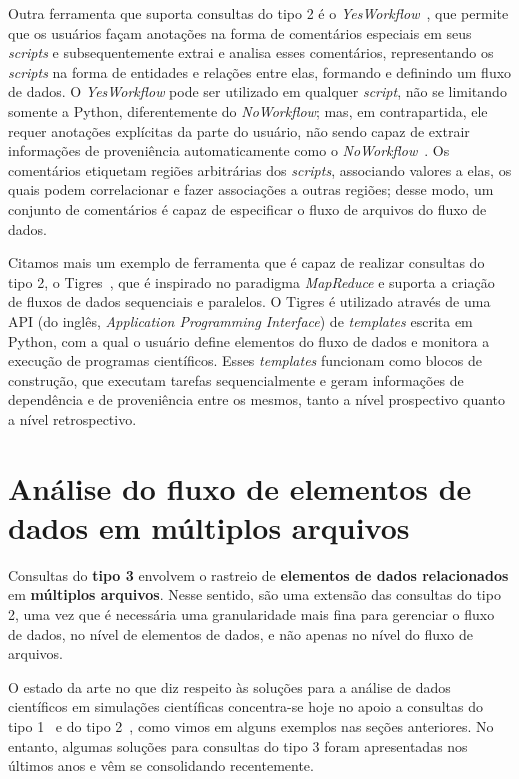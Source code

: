 Outra ferramenta que suporta consultas do tipo 2 é o \textit{YesWorkflow}~\cite{mcphillips2015yesworkflow}, que permite que os usuários façam anotações na forma de comentários especiais em seus \textit{scripts} e subsequentemente extrai e analisa esses comentários, representando os \textit{scripts} na forma de entidades e relações entre elas, formando e definindo um fluxo de dados. O \textit{YesWorkflow} pode ser utilizado em qualquer \textit{script}, não se limitando somente a Python, diferentemente do \textit{NoWorkflow}; mas, em contrapartida, ele requer anotações explícitas da parte do usuário, não sendo capaz de extrair informações de proveniência automaticamente como o \textit{NoWorkflow}~\cite{Pimentel2016}. Os comentários etiquetam regiões arbitrárias dos \textit{scripts}, associando valores a elas, os quais podem correlacionar e fazer associações a outras regiões; desse modo, um conjunto de comentários é capaz de especificar o fluxo de arquivos do fluxo de dados.

Citamos mais um exemplo de ferramenta que é capaz de realizar consultas do tipo 2, o Tigres~\cite{hendrix2016tigres}, que é inspirado no paradigma \textit{MapReduce} e suporta a criação de fluxos de dados sequenciais e paralelos. O Tigres é utilizado através de uma  API (do inglês, \textit{Application Programming Interface}) de \textit{templates} escrita em Python, com a qual o usuário define elementos do fluxo de dados e monitora a execução de programas científicos. Esses \textit{templates} funcionam como blocos de construção, que executam tarefas sequencialmente e geram informações de dependência e de proveniência entre os mesmos, tanto a nível prospectivo quanto a nível retrospectivo.

\section{Análise do fluxo de elementos de dados em múltiplos arquivos}%
\label{sec:rastreio-de-elemento-de-dados-em-multiplos-arquivos}

Consultas do \textbf{tipo 3} envolvem o rastreio de \textbf{elementos de dados relacionados} em \textbf{múltiplos arquivos}. Nesse sentido, são uma extensão das consultas do tipo 2, uma vez que é necessária uma granularidade mais fina para gerenciar o fluxo de dados, no nível de elementos de dados, e não apenas no nível do fluxo de arquivos.

O estado da arte no que diz respeito às soluções para a análise de dados científicos em simulações científicas concentra-se hoje no apoio a consultas do tipo 1~\cite{alagiannis2012nodb,karpathiotakis2014adaptive,wu2009fastbit,folk1999hdf5,silva2015propostadoutorado} e do tipo 2~\cite{murta2014noworkflow,mcphillips2015yesworkflow,hendrix2016tigres,Pimentel2016}, como vimos em alguns exemplos nas seções anteriores. No entanto, algumas soluções para consultas do tipo 3 foram apresentadas nos últimos anos e vêm se consolidando recentemente.

